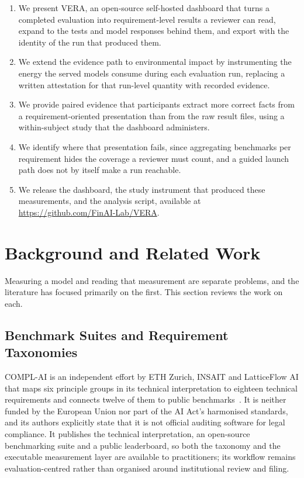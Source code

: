 \documentclass[10pt,conference,a4paper]{IEEEtran}
\providecommand{\repourl}{https://github.com/FinAI-Lab/VERA}
\begin{document}
\begin{enumerate}
   \item We present VERA, an open-source self-hosted dashboard that turns a completed evaluation into requirement-level results a reviewer can read, expand to the tests and model responses behind them, and export with the identity of the run that produced them.
  \item We extend the evidence path to environmental impact by instrumenting the energy the served models consume during each evaluation run, replacing a written attestation for that run-level quantity with recorded evidence.
  \item We provide paired evidence that participants extract more correct facts from a requirement-oriented presentation than from the raw result files, using a within-subject study that the dashboard administers.
  \item We identify where that presentation fails, since aggregating benchmarks per requirement hides the coverage a reviewer must count, and a guided launch path does not by itself make a run reachable.
  \item We release the dashboard, the study instrument that produced these measurements, and the analysis script, available at \url{\repourl}.
\end{enumerate}

\clearpage
\section{Background and Related Work}
\label{sec:background}

Measuring a model and reading that measurement are separate problems, and the literature has focused primarily on the first.
This section reviews the work on each.

\subsection{Benchmark Suites and Requirement Taxonomies}
COMPL-AI is an independent effort by ETH Zurich, INSAIT and LatticeFlow AI that maps six principle groups in its technical interpretation to eighteen technical requirements and connects twelve of them to public benchmarks~\cite{guldimann2024complai}.
It is neither funded by the European Union nor part of the AI Act's harmonised standards, and its authors explicitly state that it is not official auditing software for legal compliance.
It publishes the technical interpretation, an open-source benchmarking suite and a public leaderboard, so both the taxonomy and the executable measurement layer are available to practitioners; its workflow remains evaluation-centred rather than organised around institutional review and filing.
\end{document}
